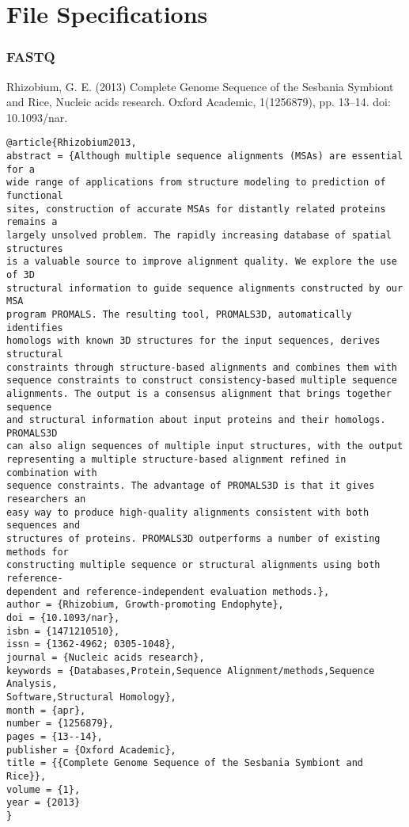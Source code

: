 \documentclass[]{article}
\begin{document}
\part{File Specifications}
\section{FASTQ}

Rhizobium, G. E. (2013) Complete Genome Sequence of the Sesbania Symbiont and Rice, Nucleic acids research. Oxford Academic, 1(1256879), pp. 13–14. doi: 10.1093/nar.

\begin{verbatim}
@article{Rhizobium2013,
abstract = {Although multiple sequence alignments (MSAs) are essential for a
wide range of applications from structure modeling to prediction of functional
sites, construction of accurate MSAs for distantly related proteins remains a
largely unsolved problem. The rapidly increasing database of spatial structures
is a valuable source to improve alignment quality. We explore the use of 3D
structural information to guide sequence alignments constructed by our MSA
program PROMALS. The resulting tool, PROMALS3D, automatically identifies
homologs with known 3D structures for the input sequences, derives structural
constraints through structure-based alignments and combines them with
sequence constraints to construct consistency-based multiple sequence
alignments. The output is a consensus alignment that brings together sequence
and structural information about input proteins and their homologs. PROMALS3D
can also align sequences of multiple input structures, with the output
representing a multiple structure-based alignment refined in combination with
sequence constraints. The advantage of PROMALS3D is that it gives researchers an
easy way to produce high-quality alignments consistent with both sequences and
structures of proteins. PROMALS3D outperforms a number of existing methods for
constructing multiple sequence or structural alignments using both reference-
dependent and reference-independent evaluation methods.},
author = {Rhizobium, Growth-promoting Endophyte},
doi = {10.1093/nar},
isbn = {1471210510},
issn = {1362-4962; 0305-1048},
journal = {Nucleic acids research},
keywords = {Databases,Protein,Sequence Alignment/methods,Sequence Analysis,
Software,Structural Homology},
month = {apr},
number = {1256879},
pages = {13--14},
publisher = {Oxford Academic},
title = {{Complete Genome Sequence of the Sesbania Symbiont and Rice}},
volume = {1},
year = {2013}
}
\end{verbatim}
\end{document}
